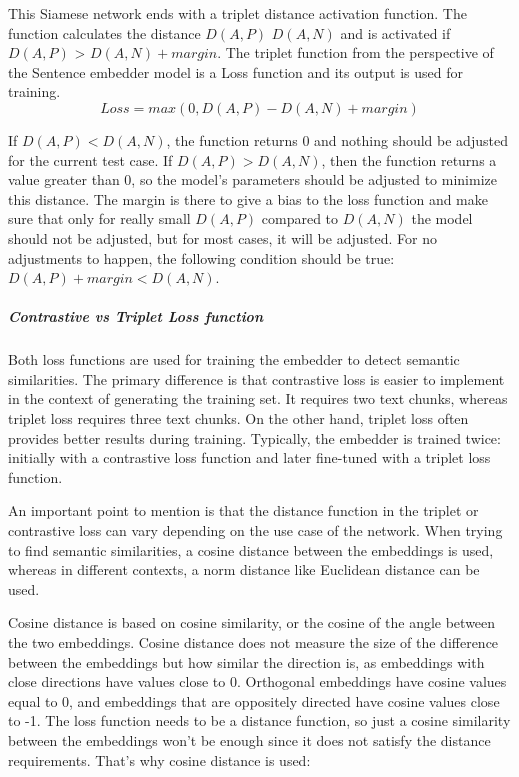\documentclass{wseas}
\begin{document}
This Siamese network ends with a triplet distance activation function.
The function calculates the distance \(D(A,P)\) \(D(A,N)\) and is
activated if \(D(A,P)\) \textgreater{} \(D(A,N) + margin\). The
triplet function from the perspective of the Sentence embedder model is
a Loss function and its output is used for training. \[
Loss = max(0, D(A,P) - D(A,N) + margin)
\] \cite{cite5}

If \(D(A,P) < D(A,N)\), the function returns 0 and nothing should be
adjusted for the current test case. If \(D(A,P) > D(A,N)\), then the
function returns a value greater than 0, so the model's parameters
should be adjusted to minimize this distance. The margin is there to
give a bias to the loss function and make sure that only for really
small \(D(A,P)\) compared to \(D(A,N)\) the model should not be
adjusted, but for most cases, it will be adjusted. For no adjustments to
happen, the following condition should be true:
\(D(A,P) + margin < D(A,N)\).

\subparagraph{Contrastive vs Triplet Loss
function}\label{contrastive-vs-triplet-loss-function}

Both loss functions are used for training the embedder to detect
semantic similarities. The primary difference is that contrastive loss
is easier to implement in the context of generating the training set. It
requires two text chunks, whereas triplet loss requires three text
chunks. On the other hand, triplet loss often provides better results
during training. Typically, the embedder is trained twice: initially
with a contrastive loss function and later fine-tuned with a triplet
loss function.

An important point to mention is that the distance function in the
triplet or contrastive loss can vary depending on the use case of the
network. When trying to find semantic similarities, a cosine distance
between the embeddings is used, whereas in different contexts, a norm
distance like Euclidean distance can be used.

Cosine distance is based on cosine similarity, or the cosine of the
angle between the two embeddings. Cosine distance does not measure the
size of the difference between the embeddings but how similar the
direction is, as embeddings with close directions have values close to
0. Orthogonal embeddings have cosine values equal to 0, and embeddings
that are oppositely directed have cosine values close to -1. The loss
function needs to be a distance function, so just a cosine similarity
between the embeddings won't be enough since it does not satisfy the
distance requirements. That's why cosine distance is used:
\end{document}
